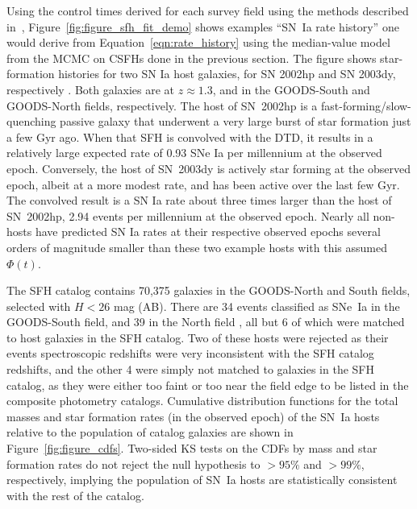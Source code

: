 \documentclass[apj]{aastex62}
\begin{document}
Using the control times derived for each survey field using the methods described in~\cite{Strolger:2015aa}, Figure~\ref{fig:figure_sfh_fit_demo} shows examples ``SN~Ia rate history'' one would derive from Equation~\ref{eqn:rate_history} using the median-value model from the MCMC on CSFHs done in the previous section. The figure shows star-formation histories for two SN Ia host galaxies, for SN 2002hp and SN 2003dy, respectively \cite[see][ for further details on these events]{Strolger:2004}. Both galaxies are at $z\approx 1.3$, and in the GOODS-South and GOODS-North fields, respectively. The host of SN~2002hp is a fast-forming/slow-quenching passive galaxy that underwent a very large burst of star formation just a few Gyr ago. When that SFH is convolved with the DTD, it results in a relatively large expected rate of 0.93 SNe Ia per millennium at the observed epoch.  Conversely, the host of SN~2003dy is actively star forming at the observed epoch, albeit at a more modest rate, and has been active over the last few Gyr. The convolved result is a SN Ia rate about three times larger than the host of SN~2002hp, 2.94 events per millennium at the observed epoch. Nearly all non-hosts have predicted SN Ia rates at their respective observed epochs several orders of magnitude smaller than these two example hosts with this assumed $\Phi(t)$.
  
  
The SFH catalog contains 70,375 galaxies in the GOODS-North and South fields, selected with $H<26$ mag (AB). There are 34 events classified as SNe~Ia in the GOODS-South field, and 39 in the North field \citep{Strolger:2004, Dahlen:2008, Rodney:2014fj}, all but 6 of which were matched to host galaxies in the SFH catalog. Two of these hosts were rejected as their events spectroscopic redshifts were very inconsistent with the SFH catalog redshifts, and the other 4 were simply not matched to galaxies in the SFH catalog, as they were either too faint or too near the field edge to be listed in the composite photometry catalogs. Cumulative distribution functions for the total masses and star formation rates (in the observed epoch) of the SN~Ia hosts relative to the population of catalog galaxies are shown in Figure~\ref{fig:figure_cdfs}.  Two-sided KS tests on the CDFs by mass and star formation rates do not reject the null hypothesis to $>95\%$ and $>99\%$, respectively, implying the population of SN~Ia hosts are statistically consistent with the rest of the catalog.
\end{document}
